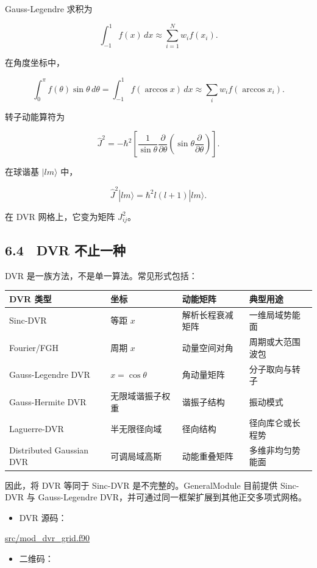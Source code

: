 \documentclass[
  a4paper,
]{ctexbook}
\providecommand{\tightlist}{%
  \setlength{\itemsep}{0pt}\setlength{\parskip}{0pt}}
\begin{document}
Gauss-Legendre 求积为

\[
\int_{-1}^{1}f(x)\,dx
\approx
\sum_{i=1}^{N}w_if(x_i).
\]

在角度坐标中，

\[
\int_0^\pi f(\theta)\sin\theta\,d\theta
=
\int_{-1}^{1}f(\arccos x)\,dx
\approx
\sum_iw_if(\arccos x_i).
\]

转子动能算符为

\[
\hat J^2
=
-\hbar^2
\left[
\frac{1}{\sin\theta}
\frac{\partial}{\partial\theta}
\left(
\sin\theta
\frac{\partial}{\partial\theta}
\right)
\right].
\]

在球谐基 \(|lm\rangle\) 中，

\[
\hat J^2|lm\rangle
=
\hbar^2l(l+1)|lm\rangle.
\]

在 DVR 网格上，它变为矩阵 \(J^2_{ij}\)。

\hypertarget{dvr-ux4e0dux6b62ux4e00ux79cd}{%
\subsection{6.4　DVR 不止一种}\label{dvr-ux4e0dux6b62ux4e00ux79cd}}

DVR 是一族方法，不是单一算法。常见形式包括：

\begin{longtable}[]{@{}llll@{}}
\toprule
DVR 类型 & 坐标 & 动能矩阵 & 典型用途\tabularnewline
\midrule
\endhead
Sinc-DVR & 等距 \(x\) & 解析长程衰减矩阵 & 一维局域势能面\tabularnewline
Fourier/FGH & 周期 \(x\) & 动量空间对角 &
周期或大范围波包\tabularnewline
Gauss-Legendre DVR & \(x=\cos\theta\) & 角动量矩阵 &
分子取向与转子\tabularnewline
Gauss-Hermite DVR & 无限域谐振子权重 & 谐振子结构 &
振动模式\tabularnewline
Laguerre-DVR & 半无限径向域 & 径向结构 & 径向库仑或长程势\tabularnewline
Distributed Gaussian DVR & 可调局域高斯 & 动能重叠矩阵 &
多维非均匀势能面\tabularnewline
\bottomrule
\end{longtable}

因此，将 DVR 等同于 Sinc-DVR 是不完整的。GeneralModule 目前提供 Sinc-DVR
与 Gauss-Legendre DVR，并可通过同一框架扩展到其他正交多项式网格。

\begin{itemize}
\tightlist
\item
  DVR 源码：
\end{itemize}

\href{https://github.com/l1Ha/QuantumGeneralModule/blob/main/src/mod_dvr_grid.f90}{src/mod\_dvr\_grid.f90}

\begin{itemize}
\tightlist
\item
  二维码：
\end{itemize}
\end{document}
